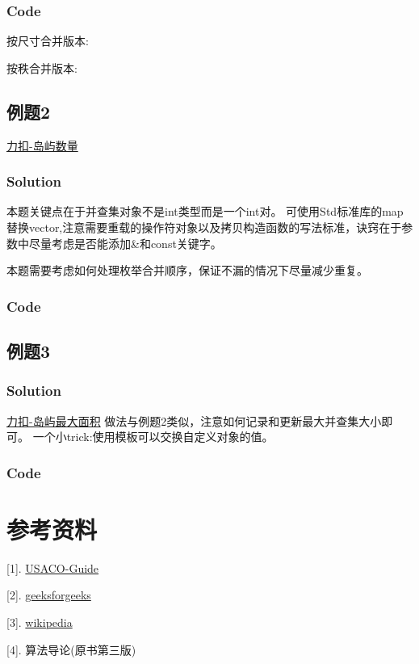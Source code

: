 \documentclass{article}
\begin{document}
    \subsubsection{Code}
    按尺寸合并版本:
    

    按秩合并版本:
    
    \subsection{例题2}
    \href{https://leetcode.cn/problems/number-of-islands/description/}{力扣-岛屿数量}
    
    \subsubsection{Solution}
    本题关键点在于并查集对象不是int类型而是一个int对。
    可使用Std标准库的map替换vector,注意需要重载的操作符对象以及拷贝构造函数的写法标准，诀窍在于参数中尽量考虑是否能添加\&和const关键字。

    本题需要考虑如何处理枚举合并顺序，保证不漏的情况下尽量减少重复。 

    \subsubsection{Code}
    

    \subsection{例题3}
    \subsubsection{Solution}
    \href{https://leetcode.cn/problems/max-area-of-island/description/}{力扣-岛屿最大面积}
    做法与例题2类似，注意如何记录和更新最大并查集大小即可。
    一个小trick:使用模板可以交换自定义对象的值。
    \subsubsection{Code}
    
    

    \section{参考资料}
    
    [1]. \href{https://usaco.guide/gold/dsu?lang=cpp}{USACO-Guide}

    [2]. \href{https://www.geeksforgeeks.org/disjoint-set-data-structures/}{geeksforgeeks}

    [3]. \href{https://en.wikipedia.org/wiki/Disjoint-set_data_structure#Proof_of_O(log*(n))_time_complexity_of_Union-Find}{wikipedia}

    [4]. 算法导论(原书第三版)
\end{document}
